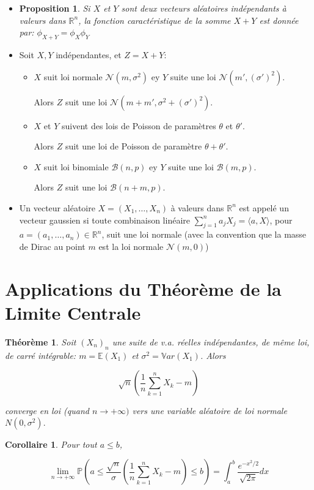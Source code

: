 \documentclass[10pt,a4paper,oneside]{article}
\newtheorem{theoreme}{Théorème}
\newtheorem{proposition}{Proposition}
\newtheorem{corollaire}{Corollaire}
\begin{document}
\begin{itemize}
\item
\begin{proposition}
Si $X$ et $Y$ sont deux vecteurs al\'eatoires ind\'ependants \`a valeurs dans $\mathbb{R}^n$, la fonction caract\'eristique de la somme $X + Y$ est donn\'ee par: $ \phi_{X + Y} = \phi_X \phi_Y$
\end{proposition}

\item
Soit $X,Y$ ind\'ependantes, et $Z = X + Y$:

\begin{itemize}
\item
$X$ suit loi normale $\mathcal{N}(m,\sigma^2)$ ey $Y$ suite une loi $\mathcal{N}(m',(\sigma')^2)$.

Alors $Z$ suit une loi $\mathcal{N}(m + m',\sigma^2 + (\sigma')^2)$.

\item
$X$ et $Y$ suivent des lois de Poisson de param\`etres $\theta$ et $\theta'$.

Alors $Z$ suit une loi de Poisson de param\`etre $\theta + \theta'$.

\item
$X$ suit loi binomiale $\mathcal{B}(n,p)$ ey $Y$ suite une loi $\mathcal{B}(m,p)$.

Alors $Z$ suit une loi $\mathcal{B}(n + m,p)$.
\end{itemize}

\item
Un vecteur al\'eatoire $X = (X_1,\ldots,X_n)$ \`a valeurs dans $\mathbb{R}^n$ est appel\'e un vecteur gaussien si toute combinaison lin\'eaire $\sum_{j = 1}^n a_j X_j = \langle a, X \rangle$, pour $a = (a_1,\ldots,a_n) \in \mathbb{R}^n$, suit une loi normale (avec la convention que la masse de Dirac au point $m$ est la loi normale $\mathcal{N}(m,0)$)

\end{itemize}

\section{Applications du Théorème de la Limite Centrale}

\begin{theoreme}
Soit $(X_n)_n$ une suite de v.a. réelles indépendantes, de même loi, de carré intégrable: $m = \mathbb{E}(X_1)$ et $\sigma^2 = \mathbb{V}ar(X_1)$. Alors

\[ \sqrt{n}(\frac{1}{n}\sum_{k = 1}^n X_k - m) \]

converge en loi (quand $n \to +\infty)$ vers une variable aléatoire de loi normale $N(0,\sigma^2).$
\end{theoreme}


\begin{corollaire}
Pour tout $a \leq b$,

\[ \lim\limits_{n \to +\infty} \mathbb{P}( a \leq \frac{\sqrt{n}}{\sigma}(\frac{1}{n}\sum_{k = 1}^n X_k - m) \leq b ) = \int_{a}^{b}  \frac{e^{ -x^2/2 }}{\sqrt{2 \pi }} dx \]
\end{corollaire}
\end{document}
